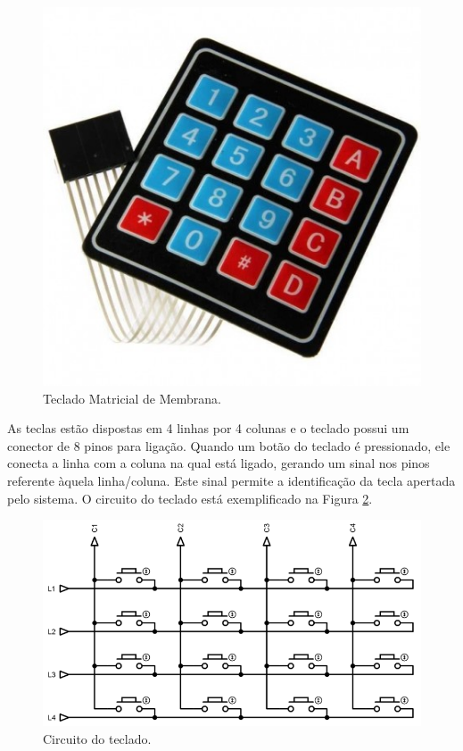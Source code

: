 \begin{figure}[htbp]
	\centering
	\includegraphics[scale=0.2]{figuras/teclado-matricial.jpg}
	\caption{Teclado Matricial de Membrana.}
	\label{fig:teclado}
\end{figure}

As teclas estão dispostas em 4 linhas por 4 colunas e o teclado possui um conector de 8 pinos para ligação. Quando um botão do teclado é pressionado, ele conecta a linha com a coluna na qual está ligado, gerando um sinal nos pinos referente àquela linha/coluna. Este sinal permite a identificação da tecla apertada pelo sistema. O circuito do teclado está exemplificado na Figura \ref{fig:teclado-conexoes}.

\begin{figure}[htbp]
	\centering
	\includegraphics[scale=0.4]{figuras/matrix-1024x558.png}
	\caption{Circuito do teclado.}
	\label{fig:teclado-conexoes}
\end{figure}

